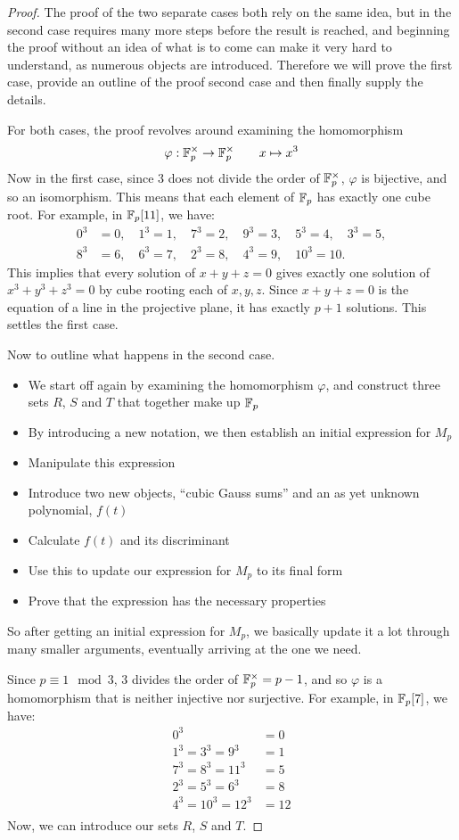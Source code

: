 \begin{proof}
The proof of the two separate cases both rely on the same idea, but in the second case requires many more steps before the result is reached, and beginning the proof without an idea of what is to come can make it very hard to understand, as numerous objects are introduced. Therefore we will prove the first case, provide an outline of the proof second case and then finally supply the details.

For both cases, the proof revolves around examining the homomorphism
$$\varphi: \mathbb{F}_p^{\times} \rightarrow \mathbb{F}_p^{\times} \qquad x \mapsto x^3$$
Now in the first case, since 3 does not divide the order of $\mathbb{F}_p^{\times}$, $\varphi$ is bijective, and so an isomorphism. This means that each element of $\mathbb{F}_p$ has exactly one cube root. For example, in $\mathbb{F}_p[11]$, we have:
\begin{align*}
	0^3 &= 0,\quad
	1^3 = 1,\quad
	7^3 = 2,\quad
	9^3 = 3,\quad
	5^3 = 4,\quad
	3^3 = 5,\\
	8^3 &= 6,\quad
	6^3 = 7,\quad
	2^3 = 8,\quad
	4^3 = 9,\quad
	10^3 = 10.
\end{align*}
This implies that every solution of $x + y + z = 0$ gives exactly one solution of $x^3 + y^3 + z^3 = 0$ by cube rooting each of $x,y,z$. Since $x + y + z = 0$ is the equation of a line in the projective plane, it has exactly $p+1$ solutions. This settles the first case.

Now to outline what happens in the second case.
\begin{itemize}
\item We start off again by examining the homomorphism $\varphi$, and construct three sets $R$, $S$ and $T$ that together make up $\mathbb{F}_p$
\item By introducing a new notation, we then establish an initial expression for $M_p$
\item Manipulate this expression
\item Introduce two new objects, ``cubic Gauss sums'' and an as yet unknown polynomial, $f(t)$
\item Calculate $f(t)$ and its discriminant
\item Use this to update our expression for $M_p$ to its final form
\item Prove that the expression has the necessary properties
\end{itemize}
So after getting an initial expression for $M_p$, we basically update it a lot through many smaller arguments, eventually arriving at the one we need.

Since $p \equiv 1 \mod{3}$, 3 divides the order of $\mathbb{F}_p^{\times} = p-1$, and so $\varphi$ is a homomorphism that is neither injective nor surjective. For example, in $\mathbb{F}_p[7]$, we have:
\begin{align*}
	0^3 &= 0\\
	1^3 = 3^3 = 9^3 &= 1\\
	7^3 = 8^3 = 11^3 &= 5\\
	2^3 = 5^3 = 6^3 &= 8\\
	4^3 = 10^3 = 12^3 &= 12\\
\end{align*}
Now, we can introduce our sets $R$, $S$ and $T$.
\end{proof}
